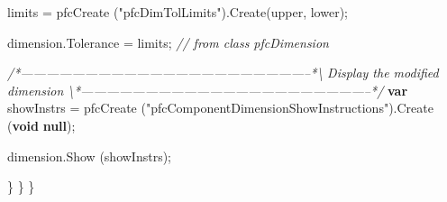 \documentclass[]{article}
\newenvironment{Shaded}{}{}
\newcommand{\KeywordTok}[1]{\textcolor[rgb]{0.00,0.44,0.13}{\textbf{{#1}}}}
\newcommand{\StringTok}[1]{\textcolor[rgb]{0.25,0.44,0.63}{{#1}}}
\newcommand{\CommentTok}[1]{\textcolor[rgb]{0.38,0.63,0.69}{\textit{{#1}}}}
\newcommand{\OtherTok}[1]{\textcolor[rgb]{0.00,0.44,0.13}{{#1}}}
\newcommand{\FunctionTok}[1]{\textcolor[rgb]{0.02,0.16,0.49}{{#1}}}
\newcommand{\NormalTok}[1]{{#1}}
\begin{document}
\begin{Shaded}
\begin{Highlighting}[]
      \NormalTok{limits =  }\FunctionTok{pfcCreate} \NormalTok{(}\StringTok{"pfcDimTolLimits"}\NormalTok{).}\FunctionTok{Create}\NormalTok{(upper, lower);}
      
      \OtherTok{dimension}\NormalTok{.}\FunctionTok{Tolerance} \NormalTok{= limits;  }\CommentTok{// from class pfcDimension}
        
 \CommentTok{/*--------------------------------------------------------------------*\textbackslash{} }
\CommentTok{   Display the modified dimension}
\CommentTok{ \textbackslash{}*--------------------------------------------------------------------*/}  
      \KeywordTok{var} \NormalTok{showInstrs = }
        \FunctionTok{pfcCreate} \NormalTok{(}\StringTok{"pfcComponentDimensionShowInstructions"}\NormalTok{).}\FunctionTok{Create} \NormalTok{(}\KeywordTok{void} \KeywordTok{null}\NormalTok{);}
      
      \OtherTok{dimension}\NormalTok{.}\FunctionTok{Show} \NormalTok{(showInstrs);}
      
    \NormalTok{\}}
    \NormalTok{\}}
\NormalTok{\}}
\end{Highlighting}
\end{Shaded}
\end{document}
